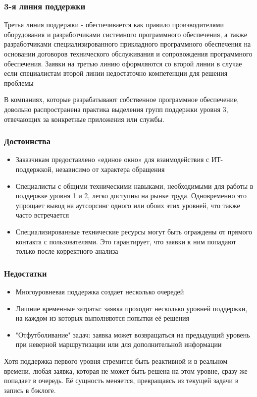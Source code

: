 \documentclass{../industrial-development}
\begin{document}
\begin{frame} \frametitle{3-я линия поддержки}

    Третья линия поддержки - обеспечивается как правило производителями оборудования и разработчиками системного программного обеспечения, а также разработчиками специализированного прикладного программного обеспечения на основании договоров технического обслуживания и сопровождения программного обеспечения. Заявки на третью линию оформляются со второй линии в случае если специалистам второй линии недостаточно компетенции для решения проблемы  

\end{frame}
\lecturenotes
В компаниях, которые разрабатывают собственное программное обеспечение, довольно распространена практика выделения групп поддержки уровня 3, отвечающих за конкретные приложения или службы.

\begin{frame} \frametitle{Достоинства}
	\begin{itemize} 
		\item Заказчикам предоставлено «единое окно» для взаимодействия с ИТ-поддержкой, независимо от характера обращения
		\item Специалисты с общими техническими навыками, необходимыми для работы в поддержке уровня 1 и 2, легко доступны на рынке труда. Одновременно это упрощает вывод на аутсорсинг одного или обоих этих уровней, что также часто встречается
		\item Специализированные технические ресурсы могут быть ограждены от прямого контакта с пользователями. Это гарантирует, что заявки к ним попадают только после корректного анализа
	\end{itemize}
\end{frame}

\begin{frame} \frametitle{Недостатки}
	\begin{itemize} 
		\item Многоуровневая поддержка создает несколько очередей
		\item Лишние временные затраты: заявка проходит несколько уровней поддержки, на каждом из которых выполняются попытки её решения
		\item "Отфутболивание" задач: заявка может возвращаться на предыдущий уровень при неверной маршрутизации или для дополнительной информации
	\end{itemize}
\end{frame}

\lecturenotes Хотя поддержка первого уровня стремится быть реактивной и в реальном времени, любая заявка, которая не может быть решена на этом уровне, сразу же попадает в очередь. Её сущность меняется, превращаясь из текущей задачи в запись в бэклоге.
\end{document}
